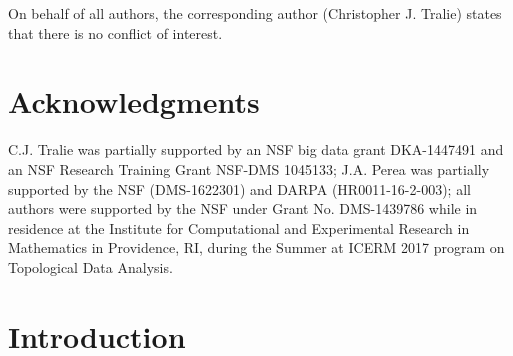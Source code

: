 \documentclass[11pt]{article}
\theoremstyle{definition}
\theoremstyle{remark}
\begin{document}
On behalf of all authors, the corresponding author (Christopher J. Tralie) states that there is no conflict of interest. 

    \section*{Acknowledgments}

    C.J. Tralie was partially supported by an NSF big data grant DKA-1447491 and an NSF Research Training Grant NSF-DMS 1045133;
    J.A. Perea was partially supported by the NSF (DMS-1622301) and  DARPA (HR0011-16-2-003);
    all authors were supported by the NSF under Grant No. DMS-1439786 while  in residence at the Institute for Computational and Experimental Research in Mathematics in Providence, RI, during the  Summer at ICERM 2017 program on Topological Data Analysis.

    \section{Introduction}
\end{document}
